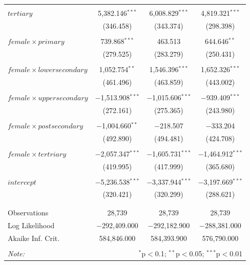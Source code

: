 \documentclass[a4paper]{article}\usepackage[]{graphicx}\usepackage[]{color}
\begin{document}
\begin{table}[H]
\begin{tabular}{@{\extracolsep{5pt}}lccc}
  & & & \\ 
 $tertiary$ & 5,382.146$^{***}$ & 6,008.829$^{***}$ & 4,819.321$^{***}$ \\ 
  & (346.458) & (343.374) & (298.398) \\ 
  & & & \\ 
 $female \times primary$ & 739.868$^{***}$ & 463.513 & 644.646$^{**}$ \\ 
  & (279.525) & (283.279) & (250.431) \\ 
  & & & \\ 
 $female \times lower secondary$ & 1,052.754$^{**}$ & 1,546.396$^{***}$ & 1,652.326$^{***}$ \\ 
  & (461.496) & (463.859) & (443.002) \\ 
  & & & \\ 
 $female \times upper secondary$ & $-$1,513.908$^{***}$ & $-$1,015.606$^{***}$ & $-$939.409$^{***}$ \\ 
  & (272.161) & (275.365) & (243.980) \\ 
  & & & \\ 
 $female \times post secondary$ & $-$1,004.660$^{**}$ & $-$218.507 & $-$333.204 \\ 
  & (492.890) & (494.481) & (424.708) \\ 
  & & & \\ 
 $female \times tertriary$ & $-$2,057.347$^{***}$ & $-$1,605.731$^{***}$ & $-$1,464.912$^{***}$ \\ 
  & (419.995) & (417.999) & (365.680) \\ 
  & & & \\ 
 $intercept$ & $-$5,236.538$^{***}$ & $-$3,337.944$^{***}$ & $-$3,197.669$^{***}$ \\ 
  & (320.421) & (320.299) & (288.621) \\ 
  & & & \\ 
\hline \\[-1.8ex] 
Observations & 28,739 & 28,739 & 28,739 \\ 
Log Likelihood & $-$292,409.000 & $-$292,182.900 & $-$288,381.000 \\ 
Akaike Inf. Crit. & 584,846.000 & 584,393.900 & 576,790.000 \\ 
\hline 
\hline \\[-1.8ex] 
\textit{Note:}  & \multicolumn{3}{r}{$^{*}$p$<$0.1; $^{**}$p$<$0.05; $^{***}$p$<$0.01} \\ 
\end{tabular} 
\end{table} 
\end{document}
